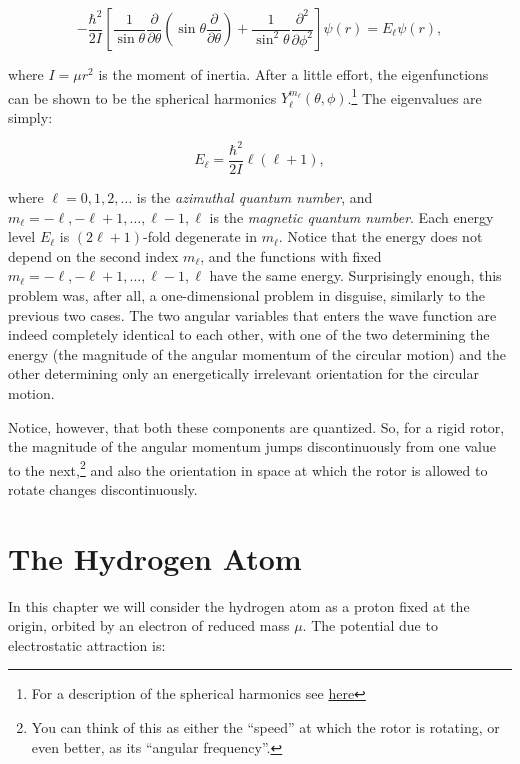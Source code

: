 \documentclass[
  9pt,
]{extbook}
\theoremstyle{definition}
\theoremstyle{definition}
\theoremstyle{definition}
\theoremstyle{remark}
\begin{document}
\begin{equation}
- \frac{\hbar^2}{2I} \left[ \frac{1}{\sin \theta}
\frac{\partial}{\partial \theta} \left(\sin\theta\frac{\partial}{\partial \theta} \right) + \frac{1}{\sin^2 \theta} \frac{\partial^2}{\partial \phi^2} \right] \psi(r) = E_{\ell} \psi(r),
\label{eq:RR1}
\end{equation}

where \(I=\mu r^2\) is the moment of inertia. After a little effort, the eigenfunctions can be shown to be the spherical harmonics \(Y_{\ell}^{m_{\ell}}(\theta, \phi)\).\footnote{For a description of the spherical harmonics see \href{https://en.wikipedia.org/wiki/Spherical_harmonic}{here}} The eigenvalues are simply:

\begin{equation}
E_{\ell} = \frac{\hbar^2}{2I} \ell(\ell+1),
\label{eq:RR2}
\end{equation}

where \(\ell=0,1,2,\ldots\) is the \emph{azimuthal quantum number}, and \(m_{\ell}=-\ell, -\ell+1, \ldots, \ell-1, \ell\) is the \emph{magnetic quantum number}. Each energy level \(E_{\ell}\) is \((2\ell+1)\)-fold degenerate in \(m_{\ell}\). Notice that the energy does not depend on the second index \(m_{\ell}\), and the functions with fixed \(m_{\ell}=-\ell,-\ell+1,\dots,\ell-1,\ell\) have the same energy. Surprisingly enough, this problem was, after all, a one-dimensional problem in disguise, similarly to the previous two cases. The two angular variables that enters the wave function are indeed completely identical to each other, with one of the two determining the energy (the magnitude of the angular momentum of the circular motion) and the other determining only an energetically irrelevant orientation for the circular motion.

Notice, however, that both these components are quantized. So, for a rigid rotor, the magnitude of the angular momentum jumps discontinuously from one value to the next,\footnote{You can think of this as either the ``speed'' at which the rotor is rotating, or even better, as its ``angular frequency''.} and also the orientation in space at which the rotor is allowed to rotate changes discontinuously.

\hypertarget{Hydrogen}{%
\chapter{The Hydrogen Atom}\label{Hydrogen}}

In this chapter we will consider the hydrogen atom as a proton fixed at the origin, orbited by an electron of reduced mass \(\mu\). The potential due to electrostatic attraction is:
\end{document}
